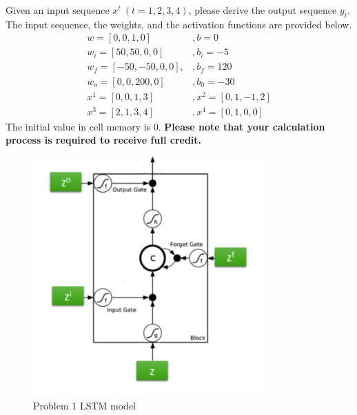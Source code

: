 \documentclass{article}
\begin{document}
Given an input sequence $x^t\ ( t = 1, 2, 3, 4 )$, please derive the output sequence $y_t$. The input sequence, the weights, and the activation functions are provided below. 
\begin{equation*}
\begin{array}{ll}
w=[0,0,1,0] & , b=0 \\
w_i=[50,50,0,0] & , b_i=-5 \\
w_f=[-50,-50,0,0], & , b_f=120 \\
w_o=[0,0,200,0] & , b_0=-30\\
x^1 = [0,0,1,3] &,x^2=[0,1,-1,2]\\
x^3=[2,1,3,4]&, x^4=[0,1,0,0]
\end{array}
\end{equation*}
The initial value in cell memory is 0. \textbf{Please note that your calculation process is required to receive full credit.}
\newpage
\begin{figure}[h]
    \centering
    \includegraphics[width=0.8\textwidth]{LSTM.png}
    \caption{Problem 1 LSTM model}
\end{figure}
\end{document}
